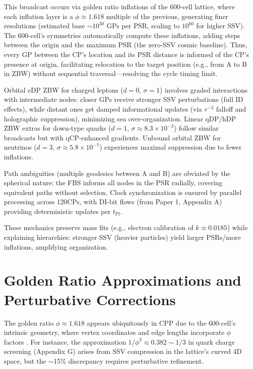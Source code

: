 \documentclass{article}
\begin{document}
This broadcast occurs via golden ratio inflations of the 600-cell lattice, where each inflation layer is a $\phi \approx 1.618$ multiple of the previous, generating finer resolutions (estimated base $\sim 10^{30}$ GPs per PSR, scaling to $10^{60}$ for higher SSV). The 600-cell's symmetries automatically compute these inflations, adding steps between the origin and the maximum PSR (the zero-SSV cosmic baseline). Thus, every GP between the CP's location and its PSR distance is informed of the CP's presence at origin, facilitating relocation to the target position (e.g., from A to B in ZBW) without sequential traversal—resolving the cycle timing limit.

Orbital eDP ZBW for charged leptons ($d=0$, $\sigma=1$) involves graded interactions with intermediate nodes: closer GPs receive stronger SSV perturbations (full ID effects), while distant ones get damped informational updates (via $r^{-2}$ falloff and holographic suppression), minimizing sea over-organization. Linear qDP/hDP ZBW extras for down-type quarks ($d=1$, $\sigma \approx 8.3 \times 10^{-3}$) follow similar broadcasts but with qCP-enhanced gradients. Unbound orbital ZBW for neutrinos ($d=3$, $\sigma \approx 5.8 \times 10^{-7}$) experiences maximal suppression due to fewer inflations.

Path ambiguities (multiple geodesics between A and B) are obviated by the spherical nature: the FBS informs all nodes in the PSR radially, covering equivalent paths without selection. Clock synchronization is ensured by parallel processing across 120CPs, with DI-bit flows (from Paper 1, Appendix A) providing deterministic updates per $t_{\text{Pl}}$.

These mechanics preserve mass fits (e.g., electron calibration of $k \approx 0.0185$) while explaining hierarchies: stronger SSV (heavier particles) yield larger PSRs/more inflations, amplifying organization.

\section{Golden Ratio Approximations and Perturbative Corrections}

The golden ratio $\phi \approx 1.618$ appears ubiquitously in CPP due to the 600-cell's intrinsic geometry, where vertex coordinates and edge lengths incorporate $\phi$ factors \cite{conway1996sphere}. For instance, the approximation $1/\phi^2 \approx 0.382 \sim 1/3$ in quark charge screening (Appendix G) arises from SSV compression in the lattice's curved 4D space, but the $\sim$15\% discrepancy requires perturbative refinement.
\end{document}
